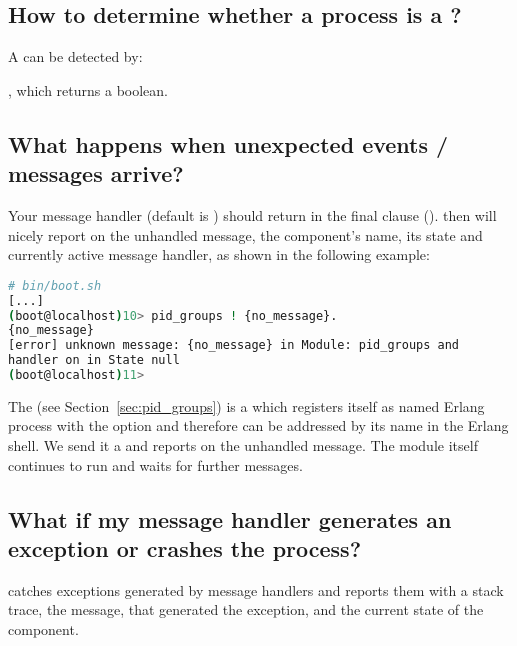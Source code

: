 \subsection{\texorpdfstring{How to determine whether a process is a ?}
             {How to determine whether a process is a gen\_component?}}

A  can be detected by:

, which returns a boolean.

\subsection{What happens when unexpected events / messages arrive?}

Your message handler (default is )
should return  in the final clause
().   then
will nicely report on the unhandled message, the component's name, its state
and currently active message handler, as shown in the following example:

\begin{lstlisting}[language=bash]
# bin/boot.sh
[...]
(boot@localhost)10> pid_groups ! {no_message}.
{no_message}
[error] unknown message: {no_message} in Module: pid_groups and
handler on in State null
(boot@localhost)11>
\end{lstlisting}

The  (see
Section~\ref{sec:pid_groups}) is a  which
registers itself as named Erlang process with the 
option  and therefore can be addressed by its name in
the Erlang shell. We send it a  and
 reports on the unhandled message. The
 module itself continues to run and waits for
further messages.

\subsection{What if my message handler generates an exception or
 crashes the process?}

 catches exceptions generated by message handlers
and reports them with a stack trace, the message, that generated the
exception, and the current state of the component.

